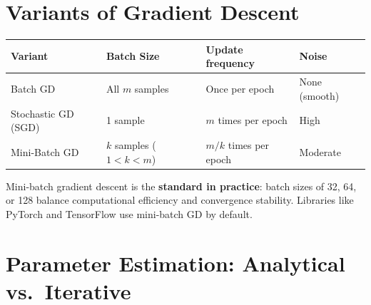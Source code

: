 \documentclass[12pt,a4paper]{report}
\begin{document}
\begin{center}
\end{center}

\section{Variants of Gradient Descent}

\begin{center}
\begin{tabular}{llll}
\toprule
\textbf{Variant} & \textbf{Batch Size} & \textbf{Update frequency} & \textbf{Noise} \\
\midrule
Batch GD & All $m$ samples & Once per epoch & None (smooth) \\
Stochastic GD (SGD) & 1 sample & $m$ times per epoch & High \\
Mini-Batch GD & $k$ samples ($1 < k < m$) & $m/k$ times per epoch & Moderate \\
\bottomrule
\end{tabular}
\end{center}

\begin{notebox}
Mini-batch gradient descent is the \textbf{standard in practice}: batch sizes of 32, 64, or 128 balance computational efficiency and convergence stability. Libraries like PyTorch and TensorFlow use mini-batch GD by default.
\end{notebox}

\section{Parameter Estimation: Analytical vs.\ Iterative}
\end{document}
